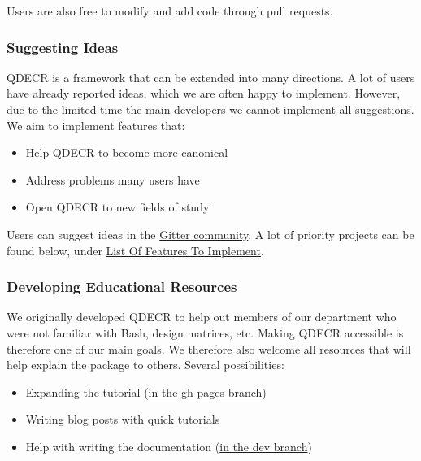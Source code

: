 \documentclass[]{article}
\providecommand{\tightlist}{%
  \setlength{\itemsep}{0pt}\setlength{\parskip}{0pt}}
\begin{document}
Users are also free to modify and add code through pull requests.

\hypertarget{suggesting-ideas}{%
\subsubsection{Suggesting Ideas}\label{suggesting-ideas}}

QDECR is a framework that can be extended into many directions. A lot of
users have already reported ideas, which we are often happy to
implement. However, due to the limited time the main developers we
cannot implement all suggestions. We aim to implement features that:

\begin{itemize}
\tightlist
\item
  Help QDECR to become more canonical
\item
  Address problems many users have
\item
  Open QDECR to new fields of study
\end{itemize}

Users can suggest ideas in the \href{https://gitter.im/QDECR/}{Gitter
community}. A lot of priority projects can be found below, under
\protect\hyperlink{list-of-features-to-implement}{List Of Features To
Implement}.

\hypertarget{developing-educational-resources}{%
\subsubsection{Developing Educational
Resources}\label{developing-educational-resources}}

We originally developed QDECR to help out members of our department who
were not familiar with Bash, design matrices, etc. Making QDECR
accessible is therefore one of our main goals. We therefore also welcome
all resources that will help explain the package to others. Several
possibilities:

\begin{itemize}
\tightlist
\item
  Expanding the tutorial
  (\href{https://github.com/slamballais/QDECR/tree/gh-pages}{in the
  gh-pages branch})
\item
  Writing blog posts with quick tutorials
\item
  Help with writing the documentation
  (\href{https://github.com/slamballais/QDECR/tree/dev}{in the dev
  branch})
\end{itemize}
\end{document}
